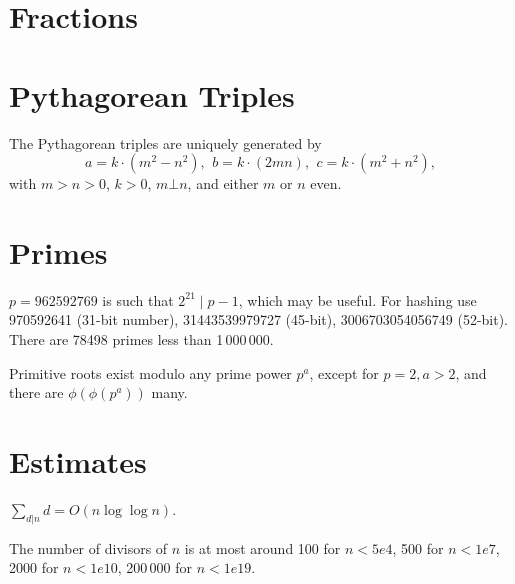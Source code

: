 \section{Fractions}

\section{Pythagorean Triples}
 The Pythagorean triples are uniquely generated by
 \[ a=k\cdot (m^{2}-n^{2}),\ \,b=k\cdot (2mn),\ \,c=k\cdot (m^{2}+n^{2}), \]
 with $m > n > 0$, $k > 0$, $m \bot n$, and either $m$ or $n$ even.

\section{Primes}
	$p=962592769$ is such that $2^{21} \mid p-1$, which may be useful. For hashing
	use 970592641 (31-bit number), 31443539979727 (45-bit), 3006703054056749
	(52-bit). There are 78498 primes less than 1\,000\,000.

	Primitive roots exist modulo any prime power $p^a$, except for $p = 2, a > 2$, and there are $\phi(\phi(p^a))$ many.

\section{Estimates}
	$\sum_{d|n} d = O(n \log \log n)$.

	The number of divisors of $n$ is at most around 100 for $n < 5e4$, 500 for $n < 1e7$, 2000 for $n < 1e10$, 200\,000 for $n < 1e19$.




